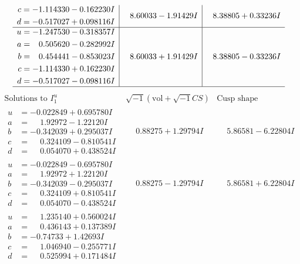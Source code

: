\documentclass[1p]{elsarticle_modified}
\theoremstyle{definition}
\newcommand{\I}{\sqrt{-1}}
\begin{document}
$$\begin{array}{c|c|c}
\begin{aligned}
c &= -1.114330 - 0.162230 I \\
d &= -0.517027 + 0.098116 I\end{aligned}
 & \phantom{-}8.60033 - 1.91429 I & \phantom{-}8.38805 + 0.33236 I \\ \hline\begin{aligned}
u &= -1.247530 - 0.318357 I \\
a &= \phantom{-}0.505620 - 0.282992 I \\
b &= \phantom{-}0.454441 - 0.853023 I \\
c &= -1.114330 + 0.162230 I \\
d &= -0.517027 - 0.098116 I\end{aligned}
 & \phantom{-}8.60033 + 1.91429 I & \phantom{-}8.38805 - 0.33236 I\\
 \hline 
 \end{array}$$\newpage$$\begin{array}{c|c|c}  
\text{Solutions to }I^u_{1}& \I (\text{vol} + \sqrt{-1}CS) & \text{Cusp shape}\\
 \hline 
\begin{aligned}
u &= -0.022849 + 0.695780 I \\
a &= \phantom{-}1.92972 - 1.22120 I \\
b &= -0.342039 + 0.295037 I \\
c &= \phantom{-}0.324109 - 0.810541 I \\
d &= \phantom{-}0.054070 + 0.438524 I\end{aligned}
 & \phantom{-}0.88275 + 1.29794 I & \phantom{-}5.86581 - 6.22804 I \\ \hline\begin{aligned}
u &= -0.022849 - 0.695780 I \\
a &= \phantom{-}1.92972 + 1.22120 I \\
b &= -0.342039 - 0.295037 I \\
c &= \phantom{-}0.324109 + 0.810541 I \\
d &= \phantom{-}0.054070 - 0.438524 I\end{aligned}
 & \phantom{-}0.88275 - 1.29794 I & \phantom{-}5.86581 + 6.22804 I \\ \hline\begin{aligned}
u &= \phantom{-}1.235140 + 0.560024 I \\
a &= \phantom{-}0.436143 + 0.137389 I \\
b &= -0.74733 + 1.42693 I \\
c &= \phantom{-}1.046940 - 0.255771 I \\
d &= \phantom{-}0.525994 + 0.171484 I\end{aligned}

\end{array}$$
\end{document}
